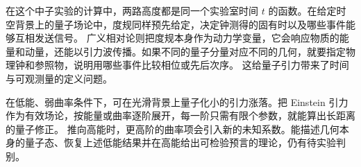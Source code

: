 在这个中子实验的计算中，两路高度都是同一个实验室时间 $t$ 的函数。在给定时空背景上的量子场论中，度规同样预先给定，决定钟测得的固有时以及哪些事件能够互相发送信号。
广义相对论则把度规本身作为动力学变量，它会响应物质的能量和动量，还能以引力波传播。如果不同的量子分量对应不同的几何，就要指定物理钟和参照物，说明用哪些事件比较相位或先后次序。
这给量子引力带来了时间与可观测量的定义问题\cite{isham-time}。

在低能、弱曲率条件下，可在光滑背景上量子化小的引力涨落。把 Einstein 引力作为有效场论，按能量或曲率逐阶展开，每一阶只需有限个参数，就能算出长距离的量子修正\cite{donoghue-gravity}。
推向高能时，更高阶的曲率项会引入新的未知系数。能描述几何本身的量子态、恢复上述低能结果并在高能给出可检验预言的理论，仍有待实验判别。

